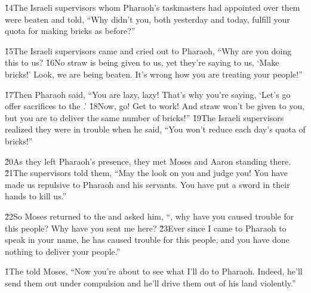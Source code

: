 \v{14}The Israeli supervisors whom Pharaoh's taskmasters had appointed over them were beaten and told, ``Why didn't you, both yesterday and today, fulfill your quota for making bricks as before?''

\v{15}The Israeli supervisors came and cried out to Pharaoh, ``Why are you doing this to us? \v{16}No straw is being given to us, yet they're saying to us, `Make bricks!' Look, we are being beaten. It's wrong how you are treating your people!''

\v{17}Then Pharaoh said, ``You are lazy, lazy! That's why you're saying, `Let's go offer sacrifices to the .' \v{18}Now, go! Get to work! And straw won't be given to you, but you are to deliver the same number of bricks!'' \v{19}The Israeli supervisors realized they were in trouble when he said, ``You won't reduce each day's quota of bricks!''

\v{20}As they left Pharaoh's presence, they met Moses and Aaron standing there. \v{21}The supervisors told them, ``May the  look on you and judge you! You have made us repulsive to Pharaoh and his servants. You have put a sword in their hands to kill us.''

\v{22}So Moses returned to the  and asked him, ``, why have you caused trouble for this people? Why have you sent me here? \v{23}Ever since I came to Pharaoh to speak in your name, he has caused trouble for this people, and you have done nothing to deliver your people.''

\v{1}The  told Moses, ``Now you're about to see what I'll do to Pharaoh. Indeed, he'll send them out under compulsion and he'll drive them out of his land violently.''

